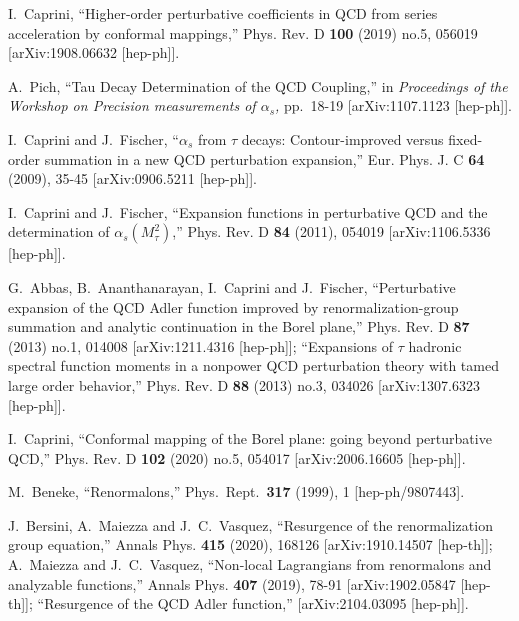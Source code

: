 \documentclass[aps,nofootinbib,showkeys,noshowpacs,preprintnumbers,amsmath,amssymb]{revtex4}
\begin{document}
\begin{thebibliography}{99}
I.~Caprini,
``Higher-order perturbative coefficients in QCD from series acceleration by conformal mappings,''
Phys. Rev. D \textbf{100} (2019) no.5, 056019
[arXiv:1908.06632 [hep-ph]].


A.~Pich,
``Tau Decay Determination of the QCD Coupling,''
in {\it Proceedings of the Workshop on Precision measurements of $\alpha_s$,} pp.~18-19
[arXiv:1107.1123 [hep-ph]].

I.~Caprini and J.~Fischer,
``$\alpha_s$ from $\tau$ decays: Contour-improved versus fixed-order summation in a new QCD perturbation expansion,''
Eur. Phys. J. C \textbf{64} (2009), 35-45
[arXiv:0906.5211 [hep-ph]].

I.~Caprini and J.~Fischer,
``Expansion functions in perturbative QCD and the determination of $\alpha_s(M_\tau^2)$,''
Phys. Rev. D \textbf{84} (2011), 054019
[arXiv:1106.5336 [hep-ph]].


G.~Abbas, B.~Ananthanarayan, I.~Caprini and J.~Fischer,
``Perturbative expansion of the QCD Adler function improved by renormalization-group summation and analytic continuation in the Borel plane,''
Phys. Rev. D \textbf{87} (2013) no.1, 014008
[arXiv:1211.4316 [hep-ph]];
``Expansions of $\tau$ hadronic spectral function moments in a nonpower QCD perturbation theory with tamed large order behavior,''
Phys. Rev. D \textbf{88} (2013) no.3, 034026
[arXiv:1307.6323 [hep-ph]].

I.~Caprini,
``Conformal mapping of the Borel plane: going beyond perturbative QCD,''
Phys. Rev. D \textbf{102} (2020) no.5, 054017
[arXiv:2006.16605 [hep-ph]].

  M.~Beneke,
  ``Renormalons,''
  Phys.\ Rept.\  {\bf 317} (1999), 1
  [hep-ph/9807443].  

J.~Bersini, A.~Maiezza and J.~C.~Vasquez,
``Resurgence of the renormalization group equation,''
Annals Phys. \textbf{415} (2020), 168126
[arXiv:1910.14507 [hep-th]];
A.~Maiezza and J.~C.~Vasquez,
``Non-local Lagrangians from renormalons and analyzable functions,''
Annals Phys. \textbf{407} (2019), 78-91
[arXiv:1902.05847 [hep-th]];
``Resurgence of the QCD Adler function,''
[arXiv:2104.03095 [hep-ph]].


\end{thebibliography}
\end{document}
